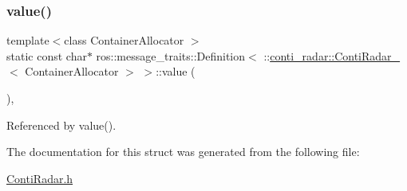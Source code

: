 \subsubsection{\texorpdfstring{value()}{value()}\hspace{0.1cm}{\footnotesize\ttfamily [2/2]}}
{\footnotesize\ttfamily template$<$class Container\+Allocator $>$ \\
static const char$\ast$ ros\+::message\+\_\+traits\+::\+Definition$<$ \+::\hyperlink{structconti__radar_1_1ContiRadar__}{conti\+\_\+radar\+::\+Conti\+Radar\+\_\+}$<$ Container\+Allocator $>$ $>$\+::value (\begin{DoxyParamCaption}\item[{const \+::\hyperlink{structconti__radar_1_1ContiRadar__}{conti\+\_\+radar\+::\+Conti\+Radar\+\_\+}$<$ Container\+Allocator $>$ \&}]{ }\end{DoxyParamCaption})\hspace{0.3cm}{\ttfamily [inline]}, {\ttfamily [static]}}



Referenced by value().



The documentation for this struct was generated from the following file\+:\begin{DoxyCompactItemize}
\item 
\hyperlink{ContiRadar_8h}{Conti\+Radar.\+h}\end{DoxyCompactItemize}
